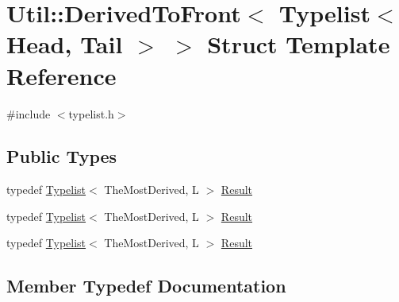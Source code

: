 \hypertarget{structUtil_1_1TL_1_1DerivedToFront_3_01Typelist_3_01Head_00_01Tail_01_4_01_4}{}\section{Util\+:\+:Derived\+To\+Front$<$ Typelist$<$ Head, Tail $>$ $>$ Struct Template Reference}
\label{structUtil_1_1TL_1_1DerivedToFront_3_01Typelist_3_01Head_00_01Tail_01_4_01_4}


{\ttfamily \#include $<$typelist.\+h$>$}

\subsection*{Public Types}
\begin{DoxyCompactItemize}
\item 
typedef \mbox{\hyperlink{structUtil_1_1Typelist}{Typelist}}$<$ The\+Most\+Derived, L $>$ \mbox{\hyperlink{structUtil_1_1TL_1_1DerivedToFront_3_01Typelist_3_01Head_00_01Tail_01_4_01_4_ae5fcbfce9e50c52c4c5cfe7626e32ddd}{Result}}
\item 
typedef \mbox{\hyperlink{structUtil_1_1Typelist}{Typelist}}$<$ The\+Most\+Derived, L $>$ \mbox{\hyperlink{structUtil_1_1TL_1_1DerivedToFront_3_01Typelist_3_01Head_00_01Tail_01_4_01_4_ae5fcbfce9e50c52c4c5cfe7626e32ddd}{Result}}
\item 
typedef \mbox{\hyperlink{structUtil_1_1Typelist}{Typelist}}$<$ The\+Most\+Derived, L $>$ \mbox{\hyperlink{structUtil_1_1TL_1_1DerivedToFront_3_01Typelist_3_01Head_00_01Tail_01_4_01_4_ae5fcbfce9e50c52c4c5cfe7626e32ddd}{Result}}
\end{DoxyCompactItemize}


\subsection{Member Typedef Documentation}
\mbox{\label{structUtil_1_1TL_1_1DerivedToFront_3_01Typelist_3_01Head_00_01Tail_01_4_01_4_ae5fcbfce9e50c52c4c5cfe7626e32ddd}} 
